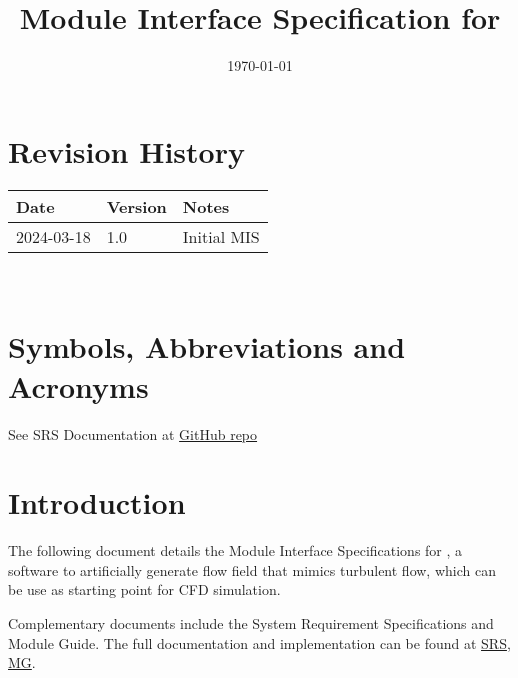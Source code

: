 \documentclass[12pt, titlepage]{article}
\begin{document}
\title{Module Interface Specification for \progname{}}

\author{\authname}

\date{\today}

\maketitle


\section{Revision History}

\begin{tabularx}{\textwidth}{p{3cm}p{2cm}X}
\toprule {\bf Date} & {\bf Version} & {\bf Notes}\\
\midrule
2024-03-18 & 1.0 & Initial MIS\\
\bottomrule
\end{tabularx}

~\newpage

\section{Symbols, Abbreviations and Acronyms}

See SRS Documentation at \href{https://github.com/omltcat/turbulent-flow/blob/main/docs/SRS/SRS.pdf}{GitHub repo}


\newpage

\tableofcontents

\newpage


\section{Introduction}

The following document details the Module Interface Specifications for \progname{}, a software to artificially generate flow field that mimics turbulent flow, which can be use as starting point for CFD simulation.

Complementary documents include the System Requirement Specifications
and Module Guide.  The full documentation and implementation can be
found at \href{https://github.com/omltcat/turbulent-flow/blob/main/docs/SRS/SRS.pdf}{SRS}, \href{https://github.com/omltcat/turbulent-flow/blob/main/docs/Design/SoftArchitecture/MG.pdf}{MG}.  
\end{document}
